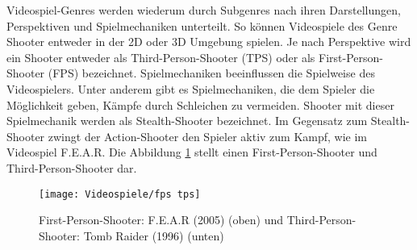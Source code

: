Videospiel-Genres werden wiederum durch Subgenres nach ihren Darstellungen, Perspektiven und Spielmechaniken unterteilt. So k\"{o}nnen Videospiele des Genre Shooter entweder in der 2D oder 3D Umgebung spielen. Je nach Perspektive wird ein Shooter entweder als Third-Person-Shooter (TPS) oder als First-Person-Shooter (FPS) bezeichnet. Spielmechaniken beeinflussen die Spielweise des Videospielers. Unter anderem gibt es Spielmechaniken, die dem Spieler die M\"{o}glichkeit geben, K\"{a}mpfe durch Schleichen zu vermeiden. Shooter mit dieser Spielmechanik werden als Stealth-Shooter bezeichnet. Im Gegensatz zum Stealth-Shooter zwingt der Action-Shooter den Spieler aktiv zum Kampf, wie im Videospiel F.E.A.R. Die Abbildung \ref{fig:fps tps} stellt einen First-Person-Shooter und Third-Person-Shooter dar.

\begin{figure}[h]
  \centering
  \texttt{[image: Videospiele/fps tps]}
	\captionsetup{justification=justified, format=plain}
  \caption{First-Person-Shooter: F.E.A.R (2005) (oben) und Third-Person-Shooter: Tomb Raider (1996) (unten)}
  \label{fig:fps tps}
\end{figure}


